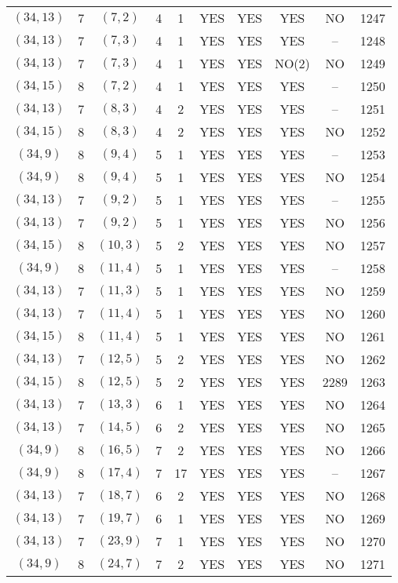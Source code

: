 \begin{longtable}{|c|c|c|c|c|c|c|c|c|c|}
$(34, 13)$ & 7 & $(7, 2)$ & 4 & 1 & YES & YES & YES & NO & 1247\\
$(34, 13)$ & 7 & $(7, 3)$ & 4 & 1 & YES & YES & YES & -- & 1248\\
$(34, 13)$ & 7 & $(7, 3)$ & 4 & 1 & YES & YES & NO(2) & NO & 1249\\
$(34, 15)$ & 8 & $(7, 2)$ & 4 & 1 & YES & YES & YES & -- & 1250\\
$(34, 13)$ & 7 & $(8, 3)$ & 4 & 2 & YES & YES & YES & -- & 1251\\
$(34, 15)$ & 8 & $(8, 3)$ & 4 & 2 & YES & YES & YES & NO & 1252\\
$(34, 9)$ & 8 & $(9, 4)$ & 5 & 1 & YES & YES & YES & -- & 1253\\
$(34, 9)$ & 8 & $(9, 4)$ & 5 & 1 & YES & YES & YES & NO & 1254\\
$(34, 13)$ & 7 & $(9, 2)$ & 5 & 1 & YES & YES & YES & -- & 1255\\
$(34, 13)$ & 7 & $(9, 2)$ & 5 & 1 & YES & YES & YES & NO & 1256\\
$(34, 15)$ & 8 & $(10, 3)$ & 5 & 2 & YES & YES & YES & NO & 1257\\
$(34, 9)$ & 8 & $(11, 4)$ & 5 & 1 & YES & YES & YES & -- & 1258\\
$(34, 13)$ & 7 & $(11, 3)$ & 5 & 1 & YES & YES & YES & NO & 1259\\
$(34, 13)$ & 7 & $(11, 4)$ & 5 & 1 & YES & YES & YES & NO & 1260\\
$(34, 15)$ & 8 & $(11, 4)$ & 5 & 1 & YES & YES & YES & NO & 1261\\
$(34, 13)$ & 7 & $(12, 5)$ & 5 & 2 & YES & YES & YES & NO & 1262\\
$(34, 15)$ & 8 & $(12, 5)$ & 5 & 2 & YES & YES & YES & 2289 & 1263\\
$(34, 13)$ & 7 & $(13, 3)$ & 6 & 1 & YES & YES & YES & NO & 1264\\
$(34, 13)$ & 7 & $(14, 5)$ & 6 & 2 & YES & YES & YES & NO & 1265\\
$(34, 9)$ & 8 & $(16, 5)$ & 7 & 2 & YES & YES & YES & NO & 1266\\
$(34, 9)$ & 8 & $(17, 4)$ & 7 & 17 & YES & YES & YES & -- & 1267\\
$(34, 13)$ & 7 & $(18, 7)$ & 6 & 2 & YES & YES & YES & NO & 1268\\
$(34, 13)$ & 7 & $(19, 7)$ & 6 & 1 & YES & YES & YES & NO & 1269\\
$(34, 13)$ & 7 & $(23, 9)$ & 7 & 1 & YES & YES & YES & NO & 1270\\
$(34, 9)$ & 8 & $(24, 7)$ & 7 & 2 & YES & YES & YES & NO & 1271\\

\end{longtable}
